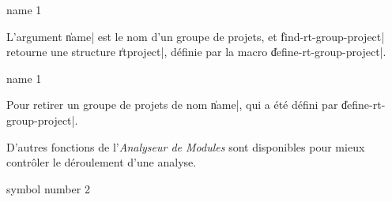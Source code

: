 %

 {name} {1}

L'argument \|name| est le nom d'un groupe de projets, et
\|find-rt-group-project| retourne une structure \|rtproject|, d\'{e}finie par la
macro \|define-rt-group-project|.

 {name} {1}

Pour retirer un groupe de projets de nom \|name|, qui a \'{e}t\'{e} d\'{e}fini
par \|define-rt-group-project|. 



D'autres fonctions de l'{\em Analyseur de Modules} sont disponibles
pour mieux contr\^{o}ler le d\'{e}roulement d'une analyse.

 {symbol number} {2}


